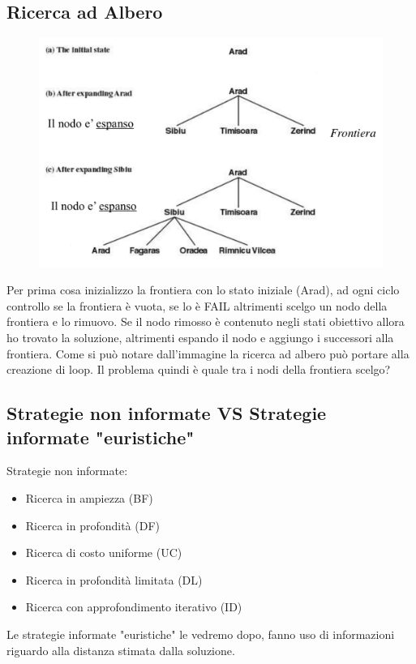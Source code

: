 \documentclass{article}
\begin{document}
\subsection{Ricerca ad Albero}
\begin{figure}[H]
    \centering
    \includegraphics[scale=0.4]{Images/alberocitta.png}
\end{figure}
Per prima cosa inizializzo la frontiera con lo stato iniziale (Arad), ad ogni ciclo controllo se la frontiera è vuota, se lo è FAIL altrimenti scelgo un nodo della frontiera e lo rimuovo. Se il nodo rimosso è contenuto negli stati obiettivo allora ho trovato la soluzione, altrimenti espando il nodo e aggiungo i successori alla frontiera. Come si può notare dall'immagine la ricerca ad albero può portare alla creazione di loop. \newline
Il problema quindi è quale tra i nodi della frontiera scelgo?

\subsection{Strategie non informate VS Strategie informate "euristiche"}
Strategie non informate:
\begin{itemize}
    \item Ricerca in ampiezza (BF)
    \item Ricerca in profondità (DF)
    \item Ricerca di costo uniforme (UC)
    \item Ricerca in profondità limitata (DL)
    \item Ricerca con approfondimento iterativo (ID)
\end{itemize}
Le strategie informate "euristiche" le vedremo dopo, fanno uso di informazioni riguardo alla distanza stimata dalla soluzione.
\end{document}
